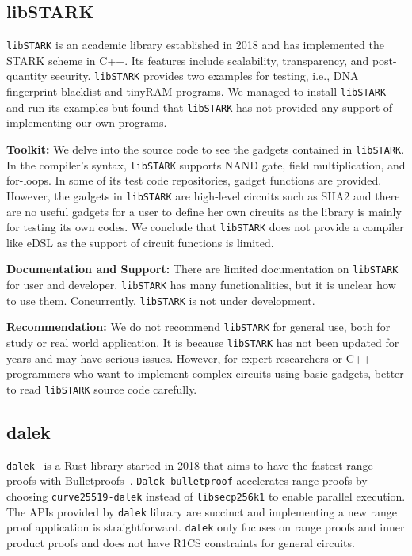 \documentclass[letterpaper,twocolumn,10pt]{article}
\theoremstyle{definition}
\newcommand{\mypara}[1]{\noindent\textbf{{#1: }}}
\newcommand{\new}[1]{{#1}\xspace}
\newcommand{\lib}[1]{\texttt{#1}\xspace}
\begin{document}
\subsection{libSTARK}
\lib{libSTARK} \cite{libsTark} is an academic library established in 2018 and has implemented the STARK scheme in C++. Its features include scalability, transparency, and post-quantity security. \lib{libSTARK} provides two examples for testing, i.e., DNA fingerprint blacklist and tinyRAM programs. We managed to install \lib{libSTARK} and run its examples but found that \lib{libSTARK} has not provided any support of implementing our own programs.

\mypara{Toolkit} We delve into the source code to see the gadgets contained in \lib{libSTARK}. \new{In the compiler's syntax, \lib{libSTARK} supports NAND gate, field multiplication, and for-loops. In some of its test code repositories, gadget functions are provided.
	However, the gadgets in \lib{libSTARK} are high-level circuits such as SHA2 and there are no useful gadgets for a user to define her own circuits as the library is mainly for testing its own codes. We conclude that \lib{libSTARK} does not provide a compiler like eDSL as the support of circuit functions is limited.
}

\mypara{Documentation and Support} There are limited documentation on \lib{libSTARK} for user and developer. \lib{libSTARK} has many functionalities, but it is unclear how to use them. Concurrently, \lib{libSTARK} is not under development.

\mypara{Recommendation} We do not recommend \lib{libSTARK} for general use, both for study or real world application. It is because \lib{libSTARK} has not been updated for years and may have serious issues. However, for expert researchers or C++ programmers who want to implement complex circuits using basic gadgets, better to read \lib{libSTARK} source code carefully.

\subsection{dalek}
\lib{dalek}~\cite{dalek-bulletproofs} is a Rust library started in 2018 that aims to have the fastest range proofs with Bulletproofs~\cite{bunz2018bulletproofs}. \lib{Dalek-bulletproof} accelerates range proofs by choosing \texttt{curve25519-dalek} instead of \texttt{libsecp256k1} to enable parallel execution. The APIs provided by \lib{dalek} library are succinct and implementing a new range proof application is straightforward. \lib{dalek} only focuses on range proofs and inner product proofs and does not have R1CS constraints for general circuits.
\end{document}
